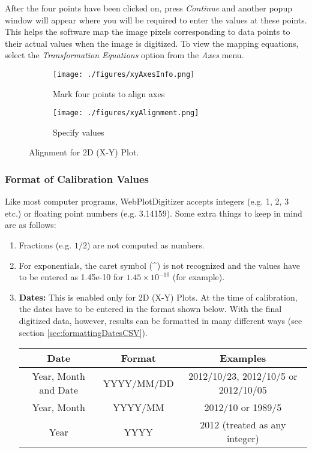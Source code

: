 \documentclass[letterpaper, 10pt]{article}
\begin{document}
After the four points have been clicked on, press \emph{Continue} and another popup window will appear where you will be required to enter the values at these points. This helps the software map the image pixels corresponding to data points to their actual values when the image is digitized. To view the mapping equations, select the \emph{Transformation Equations} option from the \emph{Axes} menu.

\begin{figure}
\centering
{\begin{subfigure}[b]{0.4\textwidth}
\texttt{[image: ./figures/xyAxesInfo.png]}
\caption{Mark four points to align axes}
\end{subfigure}
\begin{subfigure}[b]{0.4\textwidth}
\texttt{[image: ./figures/xyAlignment.png]}
\caption{Specify values}
\end{subfigure}}
\caption{Alignment for 2D (X-Y) Plot.}
\label{fig:xyAlignment}
\end{figure}

\subsubsection{Format of Calibration Values}
\label{sec:formattingInput}
Like most computer programs, WebPlotDigitizer accepts integers (e.g. 1, 2, 3 etc.) or floating point numbers (e.g. 3.14159). Some extra things to keep in mind are as follows:
\begin{enumerate}
\item{Fractions (e.g. $1/2$) are not computed as numbers.}
\item{For exponentials, the caret symbol (\^{}) is not recognized and the values have to be entered as 1.45e-10 for $1.45 \times 10^{-10}$ (for example).}
\item{{\bf Dates:} This is enabled only for 2D (X-Y) Plots. At the time of calibration, the dates have to be entered in the format shown below. With the final digitized data, however, results can be formatted in many different ways (see section \ref{sec:formattingDatesCSV}).
\begin{center}
\begin{tabular}{|c|c|c|}
\hline
Date & Format & Examples\\
\hline
Year, Month and Date & YYYY/MM/DD & 2012/10/23, 2012/10/5 or 2012/10/05\\
Year, Month & YYYY/MM & 2012/10 or 1989/5\\
Year & YYYY & 2012 (treated as any integer)\\
\hline
\end{tabular}
\end{center}
}
\end{enumerate}
\end{document}
